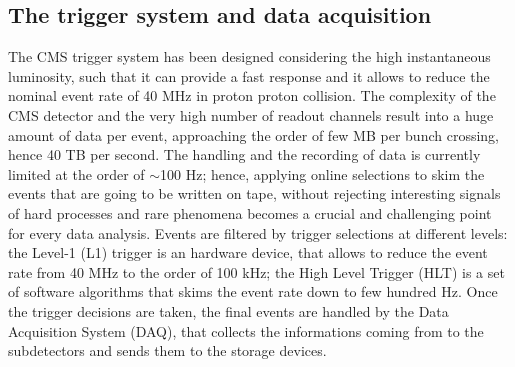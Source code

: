 
\subsection{The trigger system and data acquisition}
The CMS trigger system has been designed considering the high instantaneous luminosity, such that it can provide a fast response and it allows to reduce the nominal event rate of 40 MHz in proton proton collision. The complexity of the CMS detector and the very high number of readout channels result into a huge amount of data per event, approaching the order of few MB per bunch crossing, hence 40 TB per second. The handling and the recording of data is currently limited at the order of $\sim$100 Hz; hence, applying online selections to skim the events that are going to be written on tape, without rejecting interesting signals of hard processes and rare phenomena becomes a crucial and challenging point for every data analysis. Events are filtered by trigger selections at different levels: the Level-1 (L1) trigger is an hardware device, that allows to reduce the event rate from 40 MHz to the order of 100 kHz; the High Level Trigger (HLT) is a set of software algorithms that skims the event rate down to few hundred Hz. Once the trigger decisions are taken, the final events are handled by the Data Acquisition System (DAQ), that collects the informations coming from to the subdetectors and sends them to the storage devices.

